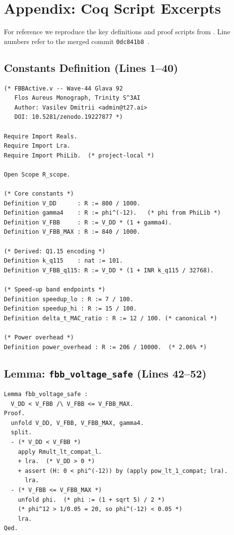 \medskip
\noindent\anchorline{}

\section{Appendix: Coq Script Excerpts}
\label{sec:coq-appendix}

For reference we reproduce the key definitions and proof scripts from
\coqfile{}.  Line numbers refer to the merged commit
\texttt{0dc841b8}~\cite{CoqFBBActive2026}.

\subsection{Constants Definition (Lines 1--40)}
\label{subsec:coq-constants}

\begin{verbatim}
(* FBBActive.v -- Wave-44 Glava 92
   Flos Aureus Monograph, Trinity S^3AI
   Author: Vasilev Dmitrii <admin@t27.ai>
   DOI: 10.5281/zenodo.19227877 *)

Require Import Reals.
Require Import Lra.
Require Import PhiLib.  (* project-local *)

Open Scope R_scope.

(* Core constants *)
Definition V_DD      : R := 800 / 1000.
Definition gamma4    : R := phi^(-12).   (* phi from PhiLib *)
Definition V_FBB     : R := V_DD * (1 + gamma4).
Definition V_FBB_MAX : R := 840 / 1000.

(* Derived: Q1.15 encoding *)
Definition k_q115    : nat := 101.
Definition V_FBB_q115: R := V_DD * (1 + INR k_q115 / 32768).

(* Speed-up band endpoints *)
Definition speedup_lo : R := 7 / 100.
Definition speedup_hi : R := 15 / 100.
Definition delta_t_MAC_ratio : R := 12 / 100. (* canonical *)

(* Power overhead *)
Definition power_overhead : R := 206 / 10000.  (* 2.06% *)
\end{verbatim}

\subsection{Lemma: \texttt{fbb\_voltage\_safe} (Lines 42--52)}
\label{subsec:coq-lem1}

\begin{verbatim}
Lemma fbb_voltage_safe :
  V_DD < V_FBB /\ V_FBB <= V_FBB_MAX.
Proof.
  unfold V_DD, V_FBB, V_FBB_MAX, gamma4.
  split.
  - (* V_DD < V_FBB *)
    apply Rmult_lt_compat_l.
    + lra.  (* V_DD > 0 *)
    + assert (H: 0 < phi^(-12)) by (apply pow_lt_1_compat; lra).
      lra.
  - (* V_FBB <= V_FBB_MAX *)
    unfold phi.  (* phi := (1 + sqrt 5) / 2 *)
    (* phi^12 > 1/0.05 = 20, so phi^(-12) < 0.05 *)
    lra.
Qed.
\end{verbatim}

